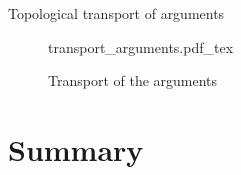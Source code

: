 \documentclass[english,handout]{beamer}
\newcommand{\incfig}[1]{%
    \def\svgwidth{\columnwidth}
    {#1.pdf_tex}
}
\newcommand{\fig}[2]{
    \begin{figure}\begin{center}\texttt{[image: figures/\#1]}\caption{#2\label{#1}}\end{center}
    \end{figure}}
\begin{document}
\begin{frame}{Topological transport of arguments}



\begin{figure}
\begin{center}
 \incfig{transport_arguments}
 \caption{Transport of the arguments}
 \end{center}
\end{figure}



\end{frame}
% 
% 
% 
% 
% 
% 
% 
%         
%         
% 

\section*{Summary}
\end{document}
